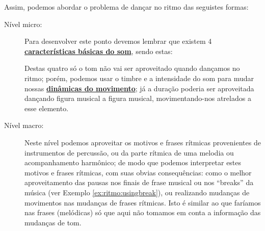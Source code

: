 Assim, podemos abordar o problema de dançar no ritmo das seguistes formas:
\begin{description}
\item [Nível micro:] Para desenvolver este ponto devemos lembrar 
que existem 4 \hyperref[sec:carateristasom]{\textbf{características básicas do som}},
sendo estas: 
Destas quatro só o tom não vai ser aproveitado quando dançamos no ritmo;
porém, podemos usar o timbre e a intensidade do som para mudar nossas 
\hyperref[sec:musicalidade:dinamicas]{\textbf{dinâmicas do movimento}};
já a duração poderia ser aproveitada dançando figura musical a figura musical,
movimentando-nos atrelados a esse elemento. 


\item [Nível macro:] Neste nível podemos aproveitar os  motivos e frases rítmicas
provenientes de instrumentos de percussão, ou da parte rítmica de uma melodia ou acompanhamento harmônico;
de modo que podemos interpretar estes motivos e frases rítmicas, 
com suas obvias consequências: como o melhor aproveitamento das pausas
 nos finais de frase musical ou nos ``breaks'' da música (ver Exemplo \ref{ex:ritmo:usingbreak}),
ou realizando mudanças de movimentos nas mudanças de frases rítmicas.
Isto é similar ao que faríamos nas frases (melódicas) só que aqui 
não tomamos em conta a informação das mudanças de tom.
\end{description}


